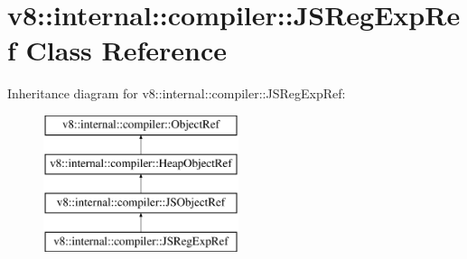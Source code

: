 \hypertarget{classv8_1_1internal_1_1compiler_1_1JSRegExpRef}{}\section{v8\+:\+:internal\+:\+:compiler\+:\+:J\+S\+Reg\+Exp\+Ref Class Reference}
\label{classv8_1_1internal_1_1compiler_1_1JSRegExpRef}
Inheritance diagram for v8\+:\+:internal\+:\+:compiler\+:\+:J\+S\+Reg\+Exp\+Ref\+:\begin{figure}[H]
\begin{center}
\leavevmode
\includegraphics[height=4.000000cm]{classv8_1_1internal_1_1compiler_1_1JSRegExpRef}
\end{center}
\end{figure}
